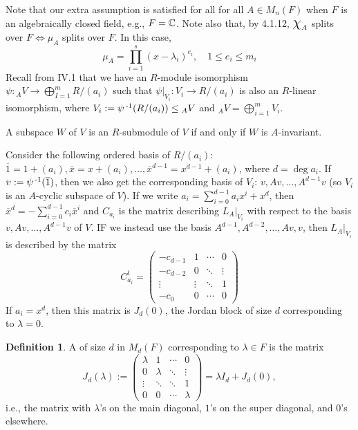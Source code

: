 \documentclass[11pt]{book}
\theoremstyle{definition}   \newtheorem{defn}[counter]{Definition} %
\newcommand{\ov}{\overline}   \newcommand{\wt}{\widetilde}
\newcommand{\mymatrix}[2]{\left( \begin{array}{#1} #2 \end{array} \right)}
\newcommand{\Chi}{\mbox{\Large $\chi$}}
\DeclareMathOperator{\ra}{\rightarrow}   \DeclareMathOperator{\Poly}{\mathbf{P}}   \DeclareMathOperator{\spn}{\textnormal{span}}   \DeclareMathOperator{\aut}{\textnormal{Aut}}
\newcommand{\vs}{\vspace{8pt}}
\numberwithin{counter}{chapter}
\begin{document}
Note that our extra assumption is satisfied for all for all $A \in M_n(F)$ when $F$ is an algebraically closed field, e.g., $F = \operatorname{\mathbb{C}}$. Note also that, by 4.1.12, $\Chi_A$ splits over $F \iff \mu_A$ splits over $F$. In this case,
	\[\mu_A = \prod_{i=1}^s (x-\lambda_i)^{e_i}, \quad 1 \leq e_i \leq m_i \]
Recall from IV.1 that we have an $R$-module isomorphism $\psi : {_AV} \ra \bigoplus_{I=1}^m R/(a_i)$ such that $\psi|_{V_i} : V_i \ra R/(a_i)$ is also an $R$-linear isomorphism, where $V_i := \psi\operatorname{^{-1}}(R/(a_i)) \leq {_AV}$ and ${_AV} = \bigoplus_{i=1}^m V_i$. 

\vs

\begin{remark*}
A subspace $W$ of $V$ is an $R$-submodule of $V$ if and only if $W$ is $A$-invariant. 
\end{remark*}

\vs

Consider the following ordered basis of $R/(a_i)$: $\ov{1} = 1 + (a_i), \ov{x} = x + (a_i),\dots, \ov{x}^{d-1} = x^{d-1} + (a_i)$, where $d = \deg a_i$. If $v := \psi\inv(\ov{1})$, then we also get the corresponding basis of $V_i$: $v, Av, \dots, A^{d-1}v$ (so $V_i$ is an $A$-cyclic subspace of $V$). If we write $a_i = \sum_{i=0}^{d-1} a_i x^i + x^d$, then $\ov{x}^d = -\sum_{i=0}^{d-1} c_i \ov{x}^i$ and $C_{a_i}$ is the matrix describing $L_A|_{V_i}$ with respect to the basis $v,Av,\dots,A^{d-1}v$ of $V$. IF we instead use the basis $A^{d-1},A^{d-2},\dots,Av,v$, then $L_A|_{V_i}$ is described by the matrix
	\[C_{a_i}^t = \mymatrix{cccc}{-c_{d-1} & 1 & \cdots & 0 \\ -c_{d-2} & 0 & \ddots & \vdots \\ \vdots & \vdots & \ddots & 1 \\ -c_0 & 0 & \cdots & 0} \]
If $a_i = x^d$, then this matrix is $J_d(0)$, the Jordan block of size $d$ corresponding to $\lambda = 0$. 

\vs

\begin{defn}
A  of size $d$ in $M_d(F)$ corresponding to $\lambda \in F$ is the matrix
	\[J_d(\lambda) := \mymatrix{cccc}{\lambda & 1 & \cdots & 0 \\ 0 & \lambda & \ddots & \vdots \\ \vdots & \ddots & \ddots & 1 \\ 0 & 0 & \cdots & \lambda} = \lambda I_d + J_d(0), \]
i.e., the matrix with $\lambda$'s on the main diagonal, $1$'s on the super diagonal, and $0$'s elsewhere. 
\end{defn}
\end{document}
